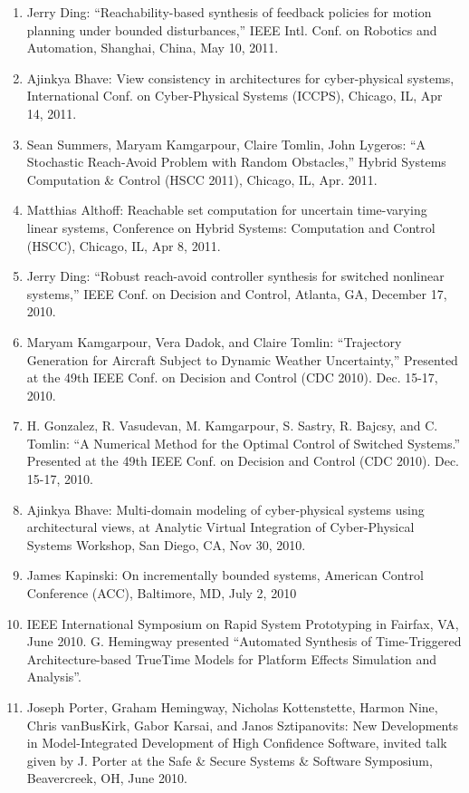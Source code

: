 \begin{enumerate}
\item Jerry Ding: ``Reachability-based synthesis of feedback policies for motion planning under bounded disturbances,'' IEEE Intl. Conf. on Robotics and Automation, Shanghai, China, May 10, 2011.
\item Ajinkya Bhave: View consistency in architectures for cyber-physical systems, International Conf. on Cyber-Physical Systems (ICCPS), Chicago, IL, Apr 14, 2011.
\item Sean Summers, Maryam Kamgarpour, Claire Tomlin, John Lygeros: ``A Stochastic Reach-Avoid Problem with Random Obstacles,''  Hybrid Systems Computation \& Control (HSCC 2011), Chicago, IL, Apr. 2011.
\item Matthias Althoff: Reachable set computation for uncertain time-varying linear systems, Conference on Hybrid Systems: Computation and Control (HSCC), Chicago, IL, Apr 8, 2011.
\item Jerry Ding: ``Robust reach-avoid controller synthesis for switched nonlinear systems,'' IEEE Conf. on Decision
and Control, Atlanta, GA, December 17, 2010.
\item Maryam Kamgarpour, Vera Dadok, and Claire Tomlin: ``Trajectory Generation for Aircraft Subject to Dynamic Weather Uncertainty,'' Presented at the 49th IEEE Conf. on Decision and Control (CDC 2010). Dec. 15-17, 2010.
\item H. Gonzalez, R. Vasudevan, M. Kamgarpour, S. Sastry, R. Bajcsy, and C. Tomlin: ``A Numerical Method for the Optimal Control of Switched Systems.'' Presented at the 49th IEEE Conf. on Decision and Control (CDC 2010). Dec. 15-17, 2010.
\item Ajinkya Bhave: Multi-domain modeling of cyber-physical systems using architectural views, at Analytic Virtual Integration of Cyber-Physical Systems Workshop, San Diego, CA, Nov 30, 2010.
\item James Kapinski: On incrementally bounded systems, American Control Conference (ACC), Baltimore, MD, July 2, 2010
\item IEEE International Symposium on Rapid System Prototyping in Fairfax, VA, June 2010.  G. Hemingway presented ``Automated Synthesis of Time-Triggered Architecture-based TrueTime Models for Platform Effects Simulation and Analysis''.
\item Joseph Porter, Graham Hemingway, Nicholas Kottenstette, Harmon Nine, Chris vanBusKirk, Gabor Karsai, and Janos Sztipanovits: New Developments in Model-Integrated Development of High Confidence Software, invited talk given by J. Porter at the Safe \& Secure Systems \& Software Symposium, Beavercreek, OH, June 2010.

\end{enumerate}
